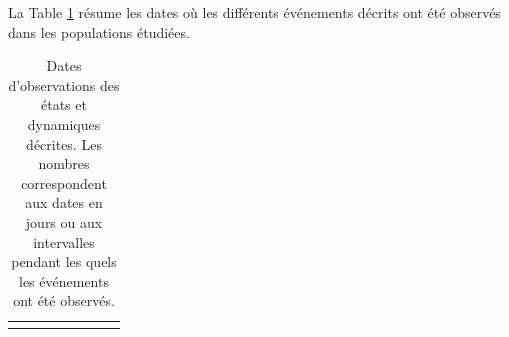La Table \ref{tab:SP} résume les dates où les différents événements décrits ont
été observés dans les populations étudiées. 

{\tiny
\begin{longtable}{
	p{}%
 	p{}
 	p{}%
 	p{}
 	p{}%
 	p{}
 	p{}%
 	p{}}
 	
 	\caption{Dates d'observations des états et dynamiques
 	décrites. Les nombres correspondent aux dates en jours ou aux
 	intervalles pendant les quels les événements ont été
 	observés.}\label{tab:SP}\\
 	\hline
 	\endhead
 	
\hline
\endfoot


\end{longtable}}
